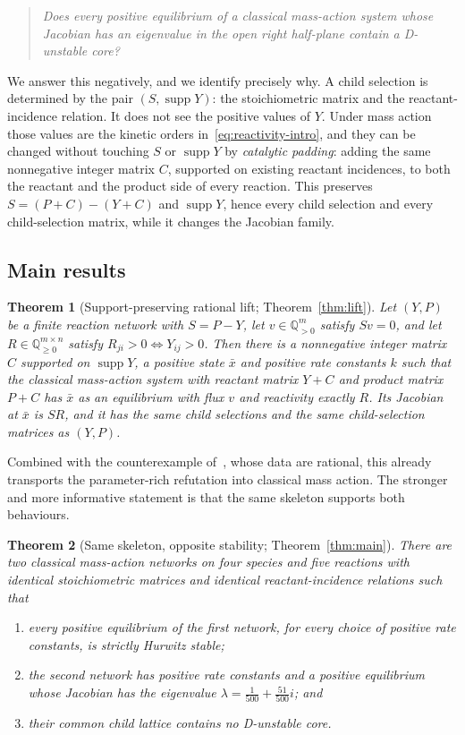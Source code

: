 \documentclass[11pt,a4paper]{article}
\theoremstyle{plain}
\newtheorem{theorem}{Theorem}[section]
\theoremstyle{definition}
\theoremstyle{remark}
\newcommand{\Q}{\mathbb{Q}}
\newcommand{\supp}{\operatorname{supp}}
\newcommand{\xbar}{\bar{x}}
\begin{document}
\begin{quote}
\emph{Does every positive equilibrium of a classical mass-action system whose Jacobian has an eigenvalue in the open right half-plane contain a D-unstable core?}
\end{quote}

We answer this negatively, and we identify precisely why. A child selection is determined by the pair $(S,\supp Y)$: the stoichiometric matrix and the reactant-incidence relation. It does not see the positive values of $Y$. Under mass action those values are the kinetic orders in~\eqref{eq:reactivity-intro}, and they can be changed without touching $S$ or $\supp Y$ by \emph{catalytic padding}: adding the same nonnegative integer matrix $C$, supported on existing reactant incidences, to both the reactant and the product side of every reaction. This preserves $S=(P+C)-(Y+C)$ and $\supp Y$, hence every child selection and every child-selection matrix, while it changes the Jacobian family.

\subsection*{Main results}

\begin{theorem}[Support-preserving rational lift; Theorem~\ref{thm:lift}]\label{thm:lift-intro}
Let $(Y,P)$ be a finite reaction network with $S=P-Y$, let $v\in\Q_{>0}^m$ satisfy $Sv=0$, and let $R\in\Q_{\ge0}^{m\times n}$ satisfy $R_{ji}>0\iff Y_{ij}>0$. Then there is a nonnegative integer matrix $C$ supported on $\supp Y$, a positive state $\xbar$ and positive rate constants $k$ such that the classical mass-action system with reactant matrix $Y+C$ and product matrix $P+C$ has $\xbar$ as an equilibrium with flux $v$ and reactivity exactly $R$. Its Jacobian at $\xbar$ is $SR$, and it has the same child selections and the same child-selection matrices as $(Y,P)$.
\end{theorem}

Combined with the counterexample of~\cite{Companion2026}, whose data are rational, this already transports the parameter-rich refutation into classical mass action. The stronger and more informative statement is that the same skeleton supports both behaviours.

\begin{theorem}[Same skeleton, opposite stability; Theorem~\ref{thm:main}]\label{thm:main-intro}
There are two classical mass-action networks on four species and five reactions with identical stoichiometric matrices and identical reactant-incidence relations such that
\begin{enumerate}[label=(\roman*)]
\item every positive equilibrium of the first network, for every choice of positive rate constants, is strictly Hurwitz stable;
\item the second network has positive rate constants and a positive equilibrium whose Jacobian has the eigenvalue $\lambda=\frac{1}{500}+\frac{51}{500}i$; and
\item their common child lattice contains no D-unstable core.
\end{enumerate}
\end{theorem}
\end{document}
